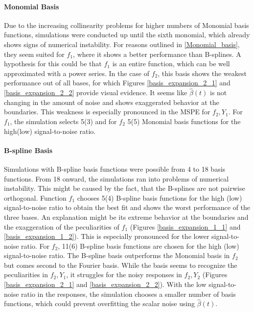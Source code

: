 \documentclass[11pt,twoside,a4paper]{article}
\begin{document}
	\paragraph{Monomial Basis}
	Due to the increasing collinearity problems for higher numbers of Monomial basis functions, simulations were conducted up until the sixth monomial, which already shows signs of numerical instability. For reasons outlined in \ref{Monomial_basis}, they seem suited for $f_1$, where it shows a better performance than B-splines. A hypothesis for this could be that $f_1$ is an entire function, which can be well approximated with a power series. In the case of $f_2$, this basis shows the weakest performance out of all bases, for which Figures \ref{basis_expansion_2_1} and \ref{basis_expansion_2_2} provide visual evidence. It seems like $\hat{\beta}(t)$ is not changing in the amount of noise and shows exaggerated behavior at the boundaries. This weakness is especially pronounced in the MSPE for $f_2,Y_1$. For $f_1$, the simulation selects 5(3) and for $f_2$ 5(5) Monomial basis functions for the high(low) signal-to-noise ratio. 
	\vspace{-0.2cm}
	
	\paragraph{B-spline Basis}
	Simulations with B-spline basis functions were possible from 4 to 18 basis functions. From 18 onward, the simulations  ran into problems of numerical instability. This might be caused by the fact, that the B-splines are not pairwise orthogonal.
	Function $f_1$ chooses 5(4) B-spline basis functions for the high (low) signal-to-noise ratio to obtain the best fit and shows the worst performance of the three bases. An explanation might be its extreme behavior at the boundaries and the exaggeration of the peculiarities of $f_1$ (Figures \ref{basis_expansion_1_1} and \ref{basis_expansion_1_2}). This is especially pronounced for the lower signal-to-noise ratio. For $f_2$, 11(6) B-spline basis functions are chosen for the high (low) signal-to-noise ratio. The B-spline basis outperforms the Monomial basis in $f_2$ but comes second to the Fourier basis. While the basis seems to recognize the peculiarities in $f_2,Y_1$, it struggles for the noisy responses in $f_2,Y_2$ (Figures \ref{basis_expansion_2_1} and \ref{basis_expansion_2_2}). With the low signal-to-noise ratio in the responses, the simulation chooses a smaller number of basis functions, which could prevent overfitting the scalar noise using $\hat{\beta}(t)$.
	\vspace{-0.2cm}
	
\end{document}
